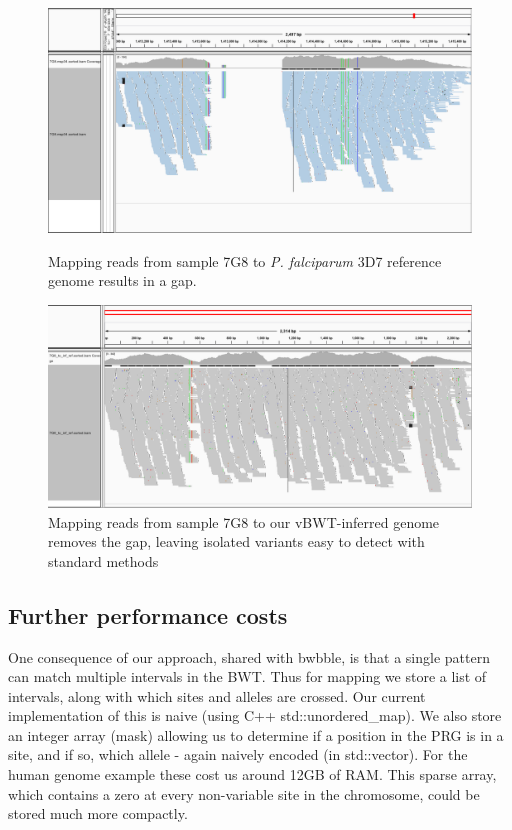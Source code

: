 \documentclass[runningheads,a4paper]{llncs}
\begin{document}
\begin{figure}[!tbp]
  \centering
  \begin{minipage}[b]{0.4\textwidth}
    \includegraphics[width=\textwidth]{7G8_to_3D7_pileup.png}
    \caption{Mapping reads from sample 7G8 to \textit{P. falciparum} 3D7 reference genome results in a gap.}
  \end{minipage}
  \hfill
  \begin{minipage}[b]{0.45\textwidth}
    \includegraphics[width=\textwidth]{7G8_to_inf_ref_pileup.png}
    \caption{Mapping reads from sample 7G8 to our vBWT-inferred genome removes the gap, leaving isolated variants easy to detect with standard methods }
  \end{minipage}
\end{figure}






\subsection{Further performance costs}
One  consequence of our approach, shared with bwbble, is that a single pattern can match multiple intervals in the BWT. Thus for mapping we store a list of intervals, along with which sites and alleles are crossed. Our current implementation of this is naive (using C++ std::unordered\_map). We also store an integer array (mask) allowing us to determine if a position in the PRG is in a site, and if so, which allele - again naively encoded (in std::vector). For the human genome example these cost us around 12GB of RAM. This sparse  array, which contains a zero at every non-variable site in the chromosome,  could be stored much more compactly.
\end{document}
